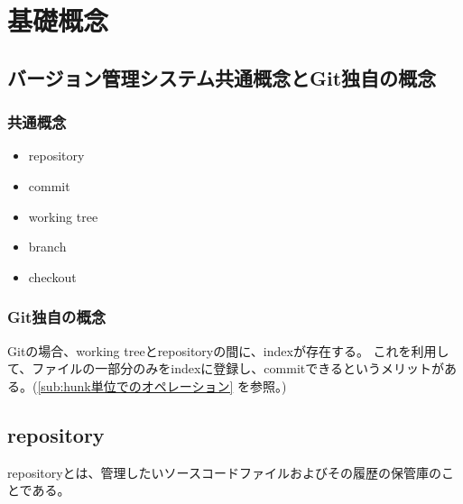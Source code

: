 \documentclass[10pt,a4j,openany,dvipdfmx]{jsarticle}
\begin{document}
\section{基礎概念} %
\label{sec:基礎概念}


\subsection{バージョン管理システム共通概念とGit独自の概念} %
\label{sub:バージョン管理システム共通概念とGit独自の概念}

\subsubsection{共通概念} %
\label{ssub:共通概念}

\begin{itemize}
  \item repository
  \item commit
  \item working tree
  \item branch
  \item checkout
\end{itemize}

\subsubsection{Git独自の概念} %
\label{ssub:git独自の概念}

Gitの場合、working treeとrepositoryの間に、indexが存在する。
これを利用して、ファイルの一部分のみをindexに登録し、commitできるというメリットがある。(\ref{sub:hunk単位でのオペレーション} を参照。)


\subsection{repository} %
\label{sub:repository}


\begin{tcolorbox}[
title=repositoryについて, fonttitle=\bfseries]
repositoryとは、管理したいソースコードファイルおよびその履歴の保管庫のことである。
\end{tcolorbox}
\end{document}
